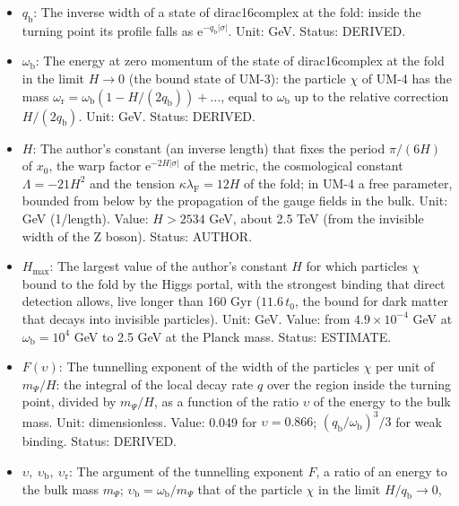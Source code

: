 \documentclass[
  10pt,
]{article}
\providecommand{\tightlist}{%
  \setlength{\itemsep}{0pt}\setlength{\parskip}{0pt}}
\begin{document}
\begin{itemize}
\tightlist
\item
  \(q_{\mathrm{b}}\): The inverse width of a state of dirac16complex at
  the fold: inside the turning point its profile falls as
  \(\mathrm{e}^{-q_{\mathrm{b}}\lvert\sigma\rvert}\). Unit: GeV. Status:
  DERIVED.
\item
  \(\omega_{\mathrm{b}}\): The energy at zero momentum of the state of
  dirac16complex at the fold in the limit \(H \to 0\) (the bound state
  of UM-3): the particle \(\chi\) of UM-4 has the mass
  \(\omega_{\mathrm{r}} = \omega_{\mathrm{b}}(1 - H/(2q_{\mathrm{b}})) + \dots\),
  equal to \(\omega_{\mathrm{b}}\) up to the relative correction
  \(H/(2q_{\mathrm{b}})\). Unit: GeV. Status: DERIVED.
\item
  \(H\): The author's constant (an inverse length) that fixes the period
  \(\pi/(6H)\) of \(x_0\), the warp factor
  \(\mathrm{e}^{-2H\lvert\sigma\rvert}\) of the metric, the cosmological
  constant \(\Lambda = -21H^2\) and the tension
  \(\kappa\lambda_{\mathrm{F}} = 12H\) of the fold; in UM-4 a free
  parameter, bounded from below by the propagation of the gauge fields
  in the bulk. Unit: GeV (1/length). Value: \(H > 2534\) GeV, about 2.5
  TeV (from the invisible width of the Z boson). Status: AUTHOR.
\item
  \(H_{\max}\): The largest value of the author's constant \(H\) for
  which particles \(\chi\) bound to the fold by the Higgs portal, with
  the strongest binding that direct detection allows, live longer than
  160 Gyr (\(11.6\,t_0\), the bound for dark matter that decays into
  invisible particles). Unit: GeV. Value: from \(4.9\times10^{-4}\) GeV
  at \(\omega_{\mathrm{b}} = 10^4\) GeV to 2.5 GeV at the Planck mass.
  Status: ESTIMATE.
\item
  \(F(\upsilon)\): The tunnelling exponent of the width of the particles
  \(\chi\) per unit of \(m_\Psi/H\): the integral of the local decay
  rate \(q\) over the region inside the turning point, divided by
  \(m_\Psi/H\), as a function of the ratio \(\upsilon\) of the energy to
  the bulk mass. Unit: dimensionless. Value: 0.049 for
  \(\upsilon = 0.866\); \((q_{\mathrm{b}}/\omega_{\mathrm{b}})^3/3\) for
  weak binding. Status: DERIVED.
\item
  \(\upsilon,\ \upsilon_{\mathrm{b}},\ \upsilon_{\mathrm{r}}\): The
  argument of the tunnelling exponent \(F\), a ratio of an energy to the
  bulk mass \(m_\Psi\);
  \(\upsilon_{\mathrm{b}} = \omega_{\mathrm{b}}/m_\Psi\) that of the
  particle \(\chi\) in the limit \(H/q_{\mathrm{b}} \to 0\),

\end{itemize}
\end{document}
